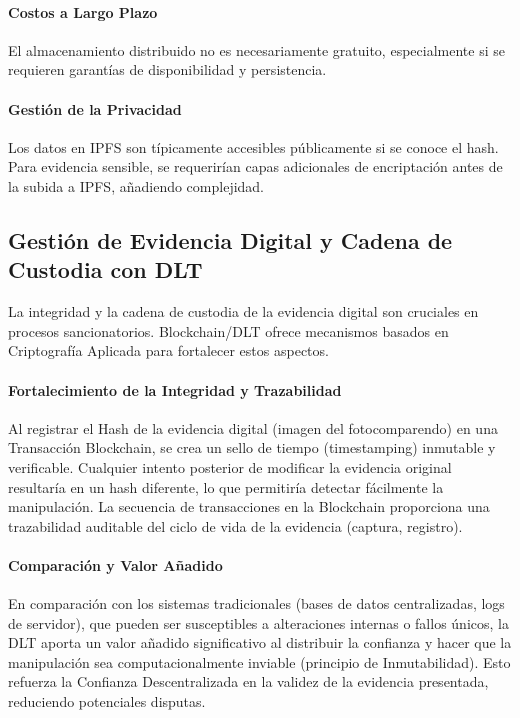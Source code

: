 \documentclass[
    letterpaper, 
    man,   
    spanish,
    12pt,
    donotrepeattitle,
    floatsintext,
    hidelinks %
]{apa7}
\begin{document}
\paragraph{Costos a Largo Plazo} El almacenamiento distribuido no es necesariamente gratuito, especialmente si se requieren garantías de disponibilidad y persistencia. 

\paragraph{Gestión de la Privacidad} Los datos en IPFS son típicamente accesibles públicamente si se conoce el hash. Para evidencia sensible, se requerirían capas adicionales de encriptación antes de la subida a IPFS, añadiendo complejidad. 

\subsection{Gestión de Evidencia Digital y Cadena de Custodia con DLT}

La integridad y la cadena de custodia de la evidencia digital son cruciales en procesos sancionatorios. Blockchain/DLT ofrece mecanismos basados en Criptografía Aplicada para fortalecer estos aspectos. 

\paragraph{Fortalecimiento de la Integridad y Trazabilidad} Al registrar el Hash de la evidencia digital (imagen del fotocomparendo) en una Transacción Blockchain, se crea un sello de tiempo (timestamping) inmutable y verificable. Cualquier intento posterior de modificar la evidencia original resultaría en un hash diferente, lo que permitiría detectar fácilmente la manipulación. La secuencia de transacciones en la Blockchain proporciona una trazabilidad auditable del ciclo de vida de la evidencia (captura, registro). 

\paragraph{Comparación y Valor Añadido} En comparación con los sistemas tradicionales (bases de datos centralizadas, logs de servidor), que pueden ser susceptibles a alteraciones internas o fallos únicos, la DLT aporta un valor añadido significativo al distribuir la confianza y hacer que la manipulación sea computacionalmente inviable (principio de Inmutabilidad). Esto refuerza la Confianza Descentralizada en la validez de la evidencia presentada, reduciendo potenciales disputas. 
\end{document}
